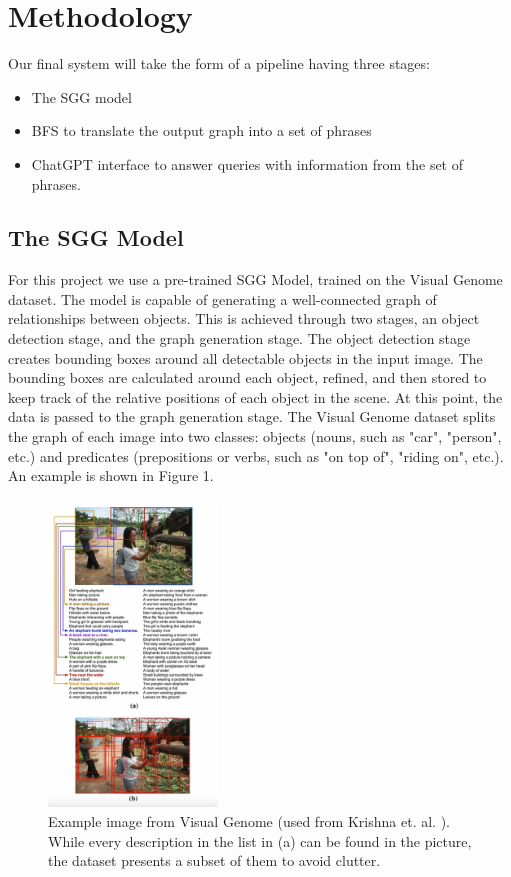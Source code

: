 \documentclass[letterpaper, 10 pt, conference]{ieeeconf}  %
\begin{document}
\section{Methodology}
    Our final system will take the form of a pipeline having three stages:
    \begin{itemize}
        \item The SGG model
        \item BFS to translate the output graph into a set of phrases
        \item ChatGPT interface to answer queries with information from the set of phrases.
    \end{itemize}

    \subsection*{The SGG Model}
        For this project we use a pre-trained SGG Model, trained on the Visual Genome dataset. The model is capable of generating a well-connected graph of relationships between objects. This is achieved through two stages, an object detection stage, and the graph generation stage. The object detection stage creates bounding boxes around all detectable objects in the input image. The bounding boxes are calculated around each object, refined, and then stored to keep track of the relative positions of each object in the scene. At this point, the data is passed to the graph generation stage.
        The Visual Genome dataset splits the graph of each image into two classes: objects (nouns, such as "car", "person", etc.) and predicates (prepositions or verbs, such as "on top of", "riding on", etc.). An example is shown in Figure 1.

        \begin{figure}
            \centering
            \includegraphics[width=0.4\textwidth]{images/visual_genome.png}
            \caption{Example image from Visual Genome (used from Krishna et. al. \cite{Krishna_Zhu_Groth_Johnson_Hata_Kravitz_Chen_Kalantidis_Li_Shamma_et_al._2017}). While every description in the list in (a) can be found in the picture, the dataset presents a subset of them to avoid clutter.}
            \label{fig:visual_genome}
        \end{figure}
        
\end{document}

